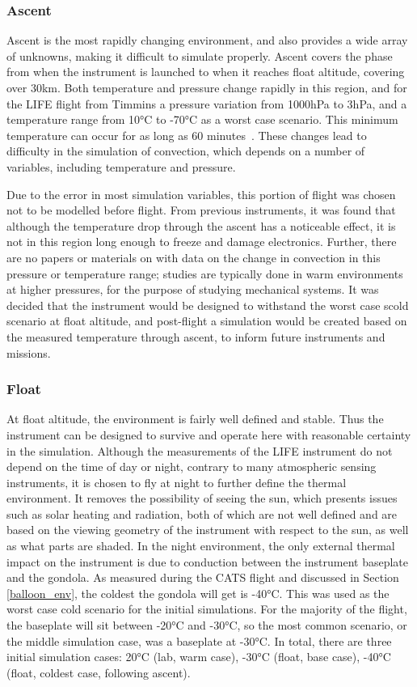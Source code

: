 \subsubsection{Ascent}
Ascent is the most rapidly changing environment, and also provides a wide array of unknowns, making it difficult to simulate properly. Ascent covers the phase from when the instrument is launched to when it reaches float altitude, covering over 30km. Both temperature and pressure change rapidly in this region, and for the LIFE flight from Timmins a pressure variation from 1000hPa to 3hPa, and a temperature range from 10°C to -70°C as a worst case scenario. This minimum temperature can occur for as long as 60 minutes~\citep{STRATOS_CARMENCITA_doc}. These changes lead to difficulty in the simulation of convection, which depends on a number of variables, including temperature and pressure.

Due to the error in most simulation variables, this portion of flight was chosen not to be modelled before flight. From previous instruments, it was found that although the temperature drop through the ascent has a noticeable effect, it is not in this region long enough to freeze and damage electronics. Further, there are no papers or materials on with data on the change in convection in this pressure or temperature range; studies are typically done in warm environments at higher pressures, for the purpose of studying mechanical systems. It was decided that the instrument would be designed to withstand the worst case scold scenario at float altitude, and post-flight a simulation would be created based on the measured temperature through ascent, to inform future instruments and missions.

\subsubsection{Float}
At float altitude, the environment is fairly well defined and stable. Thus the instrument can be designed to survive and operate here with reasonable certainty in the simulation. Although the measurements of the LIFE instrument do not depend on the time of day or night, contrary to many atmospheric sensing instruments, it is chosen to fly at night to further define the thermal environment. It removes the possibility of seeing the sun, which presents issues such as solar heating and radiation, both of which are not well defined and are based on the viewing geometry of the instrument with respect to the sun, as well as what parts are shaded. In the night environment, the only external thermal impact on the instrument is due to conduction between the instrument baseplate and the gondola. As measured during the CATS flight and discussed in Section \ref{balloon_env}, the coldest the gondola will get is -40°C. This was used as the worst case cold scenario for the initial simulations. For the majority of the flight, the baseplate will sit between -20°C and -30°C, so the most common scenario, or the middle simulation case, was a baseplate at -30°C. In total, there are three initial simulation cases: 20°C (lab, warm case), -30°C (float, base case), -40°C (float, coldest case, following ascent). 

